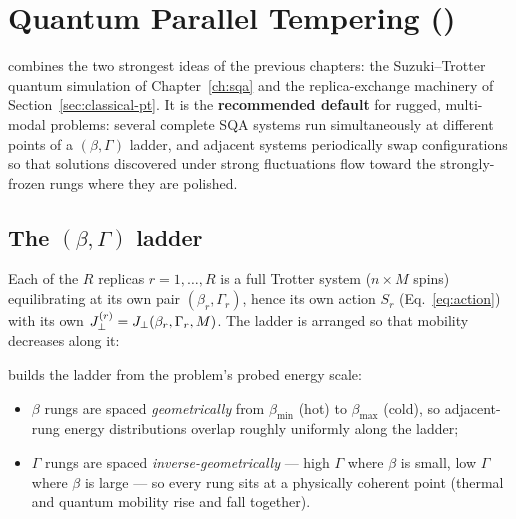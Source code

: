 \chapter{Quantum Parallel Tempering ()}
\label{ch:sqapt}

 combines the two strongest ideas of the previous chapters:
the Suzuki--Trotter quantum simulation of Chapter~\ref{ch:sqa} and the
replica-exchange machinery of Section~\ref{sec:classical-pt}. It is the
\textbf{recommended default} for rugged, multi-modal problems: several
complete SQA systems run simultaneously at different points of a
$(\beta,\Gamma)$ ladder, and adjacent systems periodically swap
configurations so that solutions discovered under strong fluctuations flow
toward the strongly-frozen rungs where they are polished.

\section{The $(\beta,\Gamma)$ ladder}

Each of the $R$ replicas $r=1,\dots,R$ is a full Trotter system
($n\times M$ spins) equilibrating at its own pair $(\beta_r,\Gamma_r)$,
hence its own action $S_r$ (Eq.~\eqref{eq:action}) with its own
$J_{\perp}^{(r)}=J_{\perp}(\beta_r,\Gamma_r,M)$. The ladder is arranged so that mobility
decreases along it:

\begin{center}
\end{center}

 builds the
ladder from the problem's probed energy scale:
\begin{itemize}
\item $\beta$ rungs are spaced \emph{geometrically} from
$\beta_{\min}$ (hot) to $\beta_{\max}$ (cold), so adjacent-rung energy
distributions overlap roughly uniformly along the ladder;
\item $\Gamma$ rungs are spaced \emph{inverse-geometrically} --- high
$\Gamma$ where $\beta$ is small, low $\Gamma$ where $\beta$ is large --- so
every rung sits at a physically coherent point (thermal and quantum mobility
rise and fall together).
\end{itemize}

